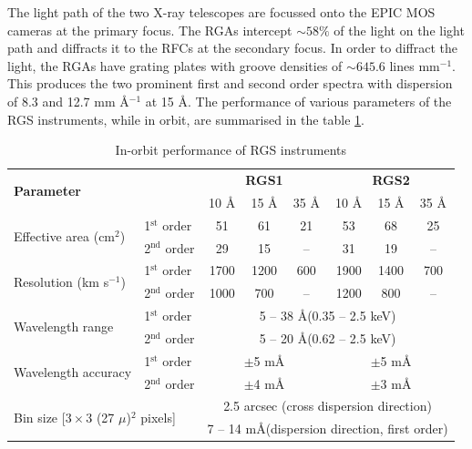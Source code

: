 		The light path of the two X-ray telescopes are focussed onto the EPIC MOS cameras at the primary focus. The RGAs intercept $\sim 58\%$ of the light on the light path and diffracts it to the RFCs at the secondary focus. In order to diffract the light, the RGAs have grating plates with groove densities of $\sim 645.6$ lines mm$^{-1}$. This produces the two prominent first and second order spectra with dispersion of 8.3 and 12.7 mm \AA$^{-1}$ at 15 \AA. The performance of various parameters of the RGS instruments, while in orbit, are summarised in the table \ref{xmm-rgs-performance}.
		
		\begin{table}[h!]
			\centering
			\caption{In-orbit performance of RGS instruments}
			\label{xmm-rgs-performance}
			\begin{tabular}{|l|l|c|c|c|c|c|c|}
				\hline
				\multicolumn{2}{|l|}{\multirow{2}{*}{\textbf{Parameter}}} & \multicolumn{3}{c|}{\textbf{RGS1}} & \multicolumn{3}{c|}{\textbf{RGS2}} \\ \cline{3-8}
				\multicolumn{2}{|l|}{} & {10 \AA} & {15 \AA} & {35 \AA} & {10 \AA} & {15 \AA} & {35 \AA} \\ \hline
				\multirow{2}{*}{Effective area (cm$^2$)} & {1$^\text{st}$ order} & {51} & {61} & {21} & {53} & {68} & {25} \\ \cline{2-8}
														 & {2$^\text{nd}$ order} & {29} & {15} & {--} & {31} & {19} & {--} \\ \hline
				\multirow{2}{*}{Resolution (km s$^{-1}$)}& {1$^\text{st}$ order} & {1700} & {1200} & {600} & {1900} & {1400} & {700} \\ \cline{2-8}
														 & {2$^\text{nd}$ order} & {1000} & {700} & {--} & {1200} & {800} & {--} \\ \hline
				\multirow{2}{*}{Wavelength range} & {1$^\text{st}$ order} & \multicolumn{6}{c|}{5 -- 38 \AA (0.35 -- 2.5 keV)} \\ \cline{2-8}
												   & {2$^\text{nd}$ order} & \multicolumn{6}{c|}{5 -- 20 \AA (0.62 -- 2.5 keV)} \\ \hline
				\multirow{2}{*}{Wavelength accuracy} & {1$^\text{st}$ order} & \multicolumn{3}{c|}{$\pm$5 m\AA} & \multicolumn{3}{c|}{$\pm$5 m\AA} \\ \cline{2-8}
                                                  	  & {2$^\text{nd}$ order} & \multicolumn{3}{c|}{$\pm$4 m\AA} & \multicolumn{3}{c|}{$\pm$3 m\AA} \\ \hline
				\multicolumn{2}{|l|}{\multirow{2}{*}{Bin size {[}$3\times 3$ (27 $\mu$)$^2$ pixels{]}}} & \multicolumn{6}{c|}{2.5 arcsec (cross dispersion direction)} \\ \cline{3-8}
				\multicolumn{2}{|l|}{} & \multicolumn{6}{c|}{7 -- 14 m\AA (dispersion direction, first order)} \\ \hline
			\end{tabular}
		\end{table}
		
